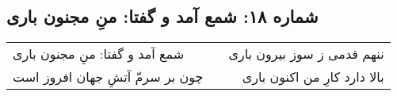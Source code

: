 \begin{center}
\section*{شماره ۱۸: شمع آمد و گفتا: منِ مجنون باری}
\label{sec:018}
\begin{longtable}{l p{0.5cm} r}
شمع آمد و گفتا: منِ مجنون باری
&&
ننهم قدمی ز سوز بیرون باری
\\
چون بر سرمّ آتشِ جهان افروز است
&&
بالا دارد کارِ من اکنون باری
\\
\end{longtable}
\end{center}
